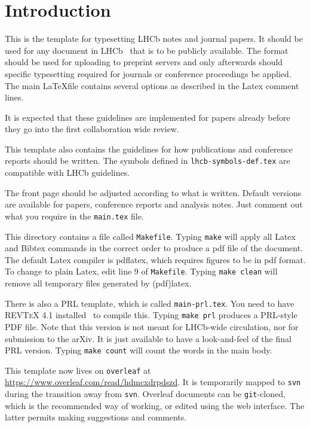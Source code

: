 \section{Introduction}
\label{sec:Introduction}
 
This is the template for typesetting LHCb notes and journal papers.
It should be used for any document in LHCb~\cite{Alves:2008zz} that is to be
publicly available. The format should be used for uploading to
preprint servers and only afterwards should specific typesetting
required for journals or conference proceedings be applied. The main
\LaTeX file contains several options as described in the Latex comment
lines.
 
It is expected that these guidelines are implemented for papers already
before they go into the first collaboration wide review.
 
This template also contains the guidelines for how publications and
conference reports should be written.
The symbols defined in \texttt{lhcb-symbols-def.tex} are compatible with
LHCb guidelines.
 
The front page should be adjusted according to what is
written. Default versions are available for papers, conference reports
and analysis notes. Just comment out what you require in the
\texttt{main.tex} file.
 
This directory contains a file called \texttt{Makefile}.
Typing \texttt{make} will apply all Latex and Bibtex commands
in the correct order to produce a pdf file of the document.
The default Latex compiler is pdflatex, which requires figures
to be in pdf format.
To change to plain Latex, edit line 9 of \texttt{Makefile}.
Typing \texttt{make clean} will remove all temporary files generated by (pdf)latex.
 
There is also a PRL template, which is called \texttt{main-prl.tex}.  You need
to have \textsc{REVTeX 4.1} installed~\cite{REVTeX} to compile this. Typing
\texttt{make prl} produces a PRL-style PDF file. Note that this version is not
meant for LHCb-wide circulation, nor for submission to the arXiv. It is just
available to have a look-and-feel of the final PRL version. Typing \texttt{make
 count} will count the words in the main body.
 
 This template now lives on {\tt overleaf} at \url{https://www.overleaf.com/read/hdmcxdrpdszd}. It is temporarily mapped to {\tt svn} during the transition away from {\tt svn}.  Overleaf documents can be {\tt git}-cloned, which is the recommended way of working, or edited using the web interface. The latter permits making suggestions and comments.
%
%
